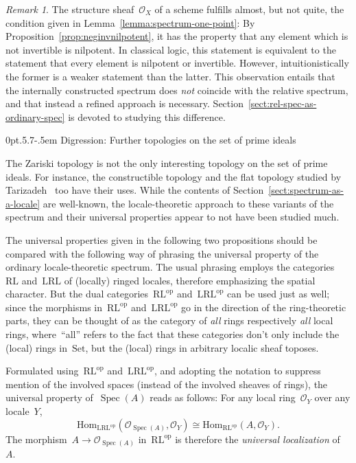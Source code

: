 \documentclass[10pt,reqno,a4paper]{amsbook}
\makeatletter
\theoremstyle{definition}
\theoremstyle{plain}
\theoremstyle{remark}
\newtheorem{rem}[defn]{Remark}
\renewcommand{\O}{\mathcal{O}}
\newcommand{\Hom}{\mathrm{Hom}}
\newcommand{\Set}{\mathrm{Set}}
\newcommand{\RL}{\mathrm{RL}}
\newcommand{\LRL}{\mathrm{LRL}}
\DeclareMathOperator{\Spec}{Spec}
\newcommand{\op}{\mathrm{op}}
\newcommand{\?}{\,{:}\,}
\renewcommand{\_}{\mathpunct{.}\,}
\def\subsection{\@startsection{subsection}{2}%
  {0pt}{.5\linespacing\@plus.7\linespacing}{-.5em}%
  {\normalfont\bfseries}}
\makeatother
\begin{document}
{\begin{rem}The structure sheaf~$\O_X$ of a scheme fulfills almost, but not
quite, the condition given in Lemma~\ref{lemma:spectrum-one-point}: By
Proposition~\ref{prop:neginvnilpotent}, it has the property that
any element which is not invertible is nilpotent. In classical logic, this
statement is equivalent to the statement that every element is nilpotent or invertible.
However, intuitionistically the former is a weaker statement than the latter.
This observation entails that the internally constructed spectrum does
\emph{not} coincide with the relative spectrum, and that instead a refined
approach is necessary. Section~\ref{sect:rel-spec-as-ordinary-spec} is devoted
to studying this difference.
\end{rem}

}


\subsection{Digression: Further topologies on the set of prime ideals}
\label{sect:flat-constructible-topologies}

The Zariski topology is not the only interesting topology on the set of prime
ideals. For instance, the constructible topology and the flat topology studied
by Tarizadeh~\cite{tarizadeh:flat} too have their uses. While the contents of
Section~\ref{sect:spectrum-as-a-locale} are well-known, the locale-theoretic
approach to these variants of the spectrum and their universal properties
appear to not have been studied much.

The universal properties given in the following two propositions should be
compared with the following way of phrasing the universal property of the
ordinary locale-theoretic spectrum. The usual phrasing employs the
categories~$\RL$ and~$\LRL$ of (locally) ringed locales, therefore emphasizing
the spatial character. But the dual categories~$\RL^\op$ and~$\LRL^\op$ can be
used just as well; since the morphisms in~$\RL^\op$ and~$\LRL^\op$ go in the
direction of the ring-theoretic parts, they can be thought of as the category
of \emph{all} rings respectively \emph{all} local rings, where~``all'' refers
to the fact that these categories don't only include the (local) rings
in~$\Set$, but the (local) rings in arbitrary localic sheaf toposes.

Formulated using~$\RL^\op$ and~$\LRL^\op$, and adopting the notation to
suppress mention of the involved spaces (instead of the involved sheaves
of rings), the universal property of~$\Spec(A)$ reads as follows: For any
local ring~$\O_Y$ over any locale~$Y$,
\[ \Hom_{\LRL^\op}(\O_{\Spec(A)}, \O_Y) \cong
  \Hom_{\RL^\op}(A, \O_Y). \]
The morphism~$A \to \O_{\Spec(A)}$ in~$\RL^\op$ is therefore the
\emph{universal localization} of~$A$.
\end{document}
